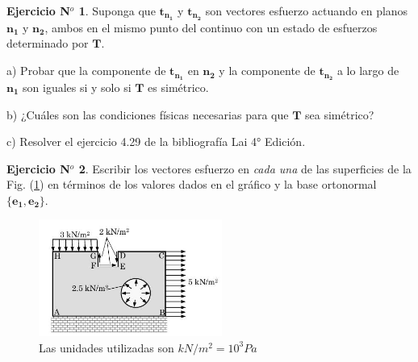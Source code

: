 \documentclass[12pt,a4paper]{article}
\theoremstyle{definition}
\newtheorem{theorem}{Ejercicio N$^o$}
\begin{document}
\bigskip

\begin{theorem}

Suponga que $\mathbf{{t_{n_1}}}$ y $\mathbf{{t_{n_2}}}$ son vectores esfuerzo actuando en planos $\mathbf{n_1}$ y $\mathbf{n_2}$, ambos en el mismo punto del continuo con un estado de esfuerzos determinado por $\mathbf{T}$.

\noindent a) Probar que la componente de $\mathbf{{t_{n_1}}}$ en $\mathbf{n_2}$ y la componente de $\mathbf{{t_{n_2}}}$ a lo largo de $\mathbf{n_1}$ son iguales si y solo si $\mathbf{T}$ es simétrico.

\noindent b) ¿Cuáles son las condiciones físicas necesarias para que $\mathbf{T}$ sea simétrico?

\noindent c) Resolver el ejercicio 4.29 de la bibliografía Lai 4° Edición.
\end{theorem}

\bigskip

\begin{theorem}
Escribir los vectores esfuerzo en \textit{cada una} de las superficies de la Fig. (\ref{fig}) en términos de los valores dados en el gráfico y la base ortonormal $\lbrace \mathbf{e_1},\mathbf{e_2} \rbrace$.


\begin{figure}[H] 
\centering \includegraphics[width=60mm]{ej2}
\caption{Las unidades utilizadas son $kN/m^2=10^3 Pa$} 
\label{fig}
\end{figure}
\end{theorem}
\end{document}
